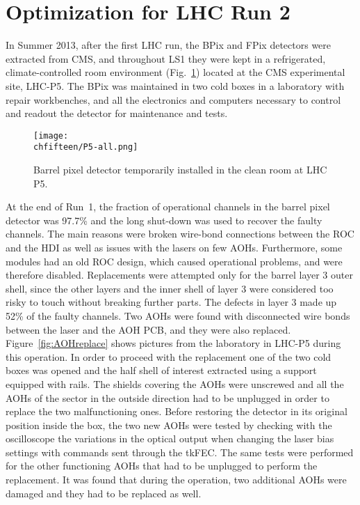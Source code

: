 \section{Optimization for LHC Run 2}

In Summer 2013, after the first LHC run, the BPix and FPix detectors were extracted from CMS, and throughout LS1 they were kept in a refrigerated, climate-controlled room environment (Fig.~\ref{fig:PixP5}) located at the CMS experimental site, LHC-P5. The BPix was maintained in two cold boxes in a laboratory with repair workbenches, and all the electronics and computers necessary to control and readout the detector for maintenance and tests.

\begin{figure}[!htb]
 \begin{center}
 \texttt{[image: \\chfifteen/P5-all.png]}
 \end{center}
 \caption{Barrel pixel detector temporarily installed in the clean room at LHC P5.}
 \label{fig:PixP5}
\end{figure}

At the end of Run~1, the fraction of operational channels in the barrel pixel detector was 97.7\% and the long shut-down was used to recover the faulty channels.
The main reasons were broken wire-bond connections between the ROC and the HDI as well as issues with the lasers on few AOHs.
Furthermore, some modules had an old ROC design, which caused operational problems, and were therefore disabled.
Replacements were attempted only for the barrel layer 3 outer shell, since the other layers and the inner shell of layer 3 were considered too risky to touch without breaking further parts.
The defects in layer 3 made up 52\% of the faulty channels.
Two AOHs were found with disconnected wire bonds between the laser and the AOH PCB, and they were also replaced. Figure~\ref{fig:AOHreplace} shows pictures from the laboratory in LHC-P5 during this operation.
In order to proceed with the replacement one of the two cold boxes was opened and the half shell of interest extracted using a support equipped with rails.
The shields covering the AOHs were unscrewed and all the AOHs of the sector in the outside direction had to be unplugged in order to replace the two malfunctioning ones.
Before restoring the detector in its original position inside the box, the two new AOHs were tested by checking with the oscilloscope the variations in the optical output when changing the laser bias settings with commands sent through the tkFEC. The same tests were performed for the other functioning AOHs that had to be unplugged to perform the replacement. It was found that during the operation, two additional AOHs were damaged and they had to be replaced as well.

